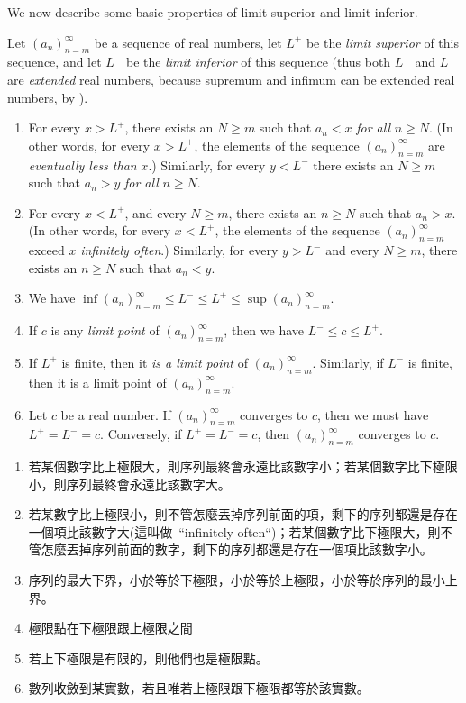 We now describe some basic properties of limit superior and limit inferior.

\begin{proposition} \label{prop 6.4.12}
Let \((a_n)_{n = m}^{\infty}\) be a sequence of real numbers, let \(L^+\) be the \emph{limit superior} of this sequence, and let \(L^-\) be the \emph{limit inferior} of
this sequence (thus both \(L^+\) and \(L^-\) are \emph{extended} real numbers, because supremum and infimum can be extended real numbers, by ).
\begin{enumerate}
\item For every \(x > L^+\), there exists an \(N \ge m\) such that \(a_n < x\) \emph{for all} \(n \ge N\).
      (In other words, for every \(x > L^+\), the elements of the sequence \((a_n)_{n = m}^{\infty}\) are \emph{eventually less than} \(x\).)
      Similarly, for every \(y < L^-\) there exists an \(N \ge m\) such that \(a_n > y\) \emph{for all} \(n \ge N\).
\item For every \(x < L^+\), and every \(N \ge m\), there exists an \(n \ge N\) such that \(a_n > x\).
      (In other words, for every \(x < L^+\), the elements of the sequence \((a_n)_{n = m}^{\infty}\) exceed \(x\) \emph{infinitely often}.)
      Similarly, for every \(y > L^-\) and every \(N \ge m\), there exists an \(n \ge N\) such that \(a_n < y\).
\item We have \(\inf(a_n)_{n = m}^{\infty} \le L^- \le L^+ \le \sup(a_n)_{n = m}^{\infty}\).
\item If \(c\) is any \emph{limit point} of \((a_n)_{n = m}^{\infty}\), then we have \(L^- \le c \le L^+\).
\item If \(L^+\) is finite, then it \emph{is a limit point} of \((a_n)_{n = m}^{\infty}\).
      Similarly, if \(L^-\) is finite, then it is a limit point of \((a_n)_{n = m}^{\infty}\).
\item Let \(c\) be a real number.
      If \((a_n)_{n = m}^{\infty}\) converges to \(c\), then we must have \(L^+ = L^- = c\).
      Conversely, if \(L^+ = L^- = c\), then \((a_n)_{n = m}^{\infty}\) converges to \(c\).
\end{enumerate}
\end{proposition}

\begin{note}
\begin{enumerate}
\item 若某個數字比上極限大，則序列最終會永遠比該數字小；若某個數字比下極限小，則序列最終會永遠比該數字大。
\item 若某數字比上極限小，則不管怎麼丟掉序列前面的項，剩下的序列都還是存在一個項比該數字大(這叫做\ ``infinitely often``)；若某個數字比下極限大，則不管怎麼丟掉序列前面的數字，剩下的序列都還是存在一個項比該數字小。
\item 序列的最大下界，小於等於下極限，小於等於上極限，小於等於序列的最小上界。
\item 極限點在下極限跟上極限之間
\item 若上下極限是有限的，則他們也是極限點。
\item 數列收斂到某實數，若且唯若上極限跟下極限都等於該實數。
\end{enumerate}
\end{note}

